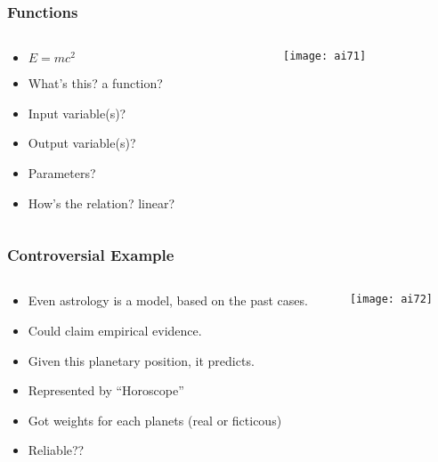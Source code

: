 \begin{frame}[fragile]\frametitle{Functions}

\begin{columns}
    \begin{column}[T]{0.6\linewidth}

\begin{itemize}
\item $E = mc^2$
\item What's this? a function?
\item Input variable(s)?
\item Output variable(s)?
\item Parameters?
\item How's the relation? linear?
\end{itemize}

    \end{column}
    \begin{column}[T]{0.4\linewidth}

			\begin{center}
			\texttt{[image: ai71]}
			\end{center}
			
    \end{column}
  \end{columns}
  

\end{frame}

\begin{frame}[fragile]\frametitle{Controversial Example}

\begin{columns}
    \begin{column}[T]{0.6\linewidth}

\begin{itemize}
\item Even astrology is a model, based on the past cases.
\item Could claim empirical evidence. 
\item Given this planetary position, it predicts.
\item Represented by ``Horoscope''
\item Got weights for each planets (real or ficticous)
\item Reliable??
\end{itemize}

    \end{column}
    \begin{column}[T]{0.4\linewidth}

			\begin{center}
			\texttt{[image: ai72]}
			\end{center}
			
    \end{column}
  \end{columns}
  
\end{frame}



